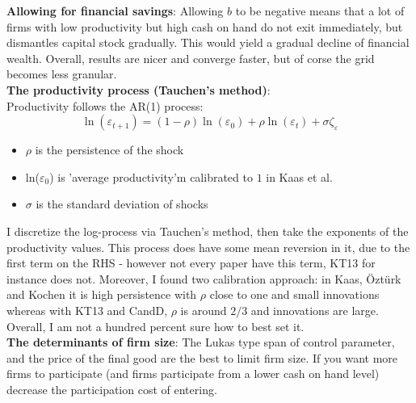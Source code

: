 \documentclass[12pt]{article}
\begin{document}
\textbf{Allowing for financial savings}:  Allowing $b$ to be negative means that a lot of firms with low productivity but high cash on hand do not exit immediately, but dismantles capital stock gradually. This would yield a gradual decline of financial wealth. Overall, results are nicer and converge faster, but of corse the grid becomes less granular. \vspace{3mm} \\
\textbf{The productivity process (Tauchen's method)}: \\
Productivity follows the AR(1) process:
$$ \ln(\varepsilon_{t+1}) = (1-\rho) \ln(\varepsilon_0) + \rho \ln(\varepsilon_t) + \sigma \zeta_\varepsilon $$
\begin{itemize}\setlength\itemsep{0em} \small
    \item $\rho$ is the persistence of the shock
    \item ln($\varepsilon_0$) is 'average productivity'm calibrated to $1$ in Kaas et al.
    \item $\sigma$ is the standard deviation of shocks
\end{itemize} \normalsize
I discretize the log-process via Tauchen's method, then take the exponents of the productivity values. This process does have some mean reversion in it, due to the first term on the RHS - however not every paper have this term, KT13 for instance does not. Moreover, I found two calibration approach: in Kaas, Öztürk and Kochen it is high persistence with $\rho$ close to one and small innovations whereas with KT13 and CandD, $\rho$ is around $2/3$ and innovations are large. Overall, I am not a hundred percent sure how to best set it.  \vspace{3mm} \\
\textbf{The determinants of firm size}: The Lukas type span of control parameter, and the price of the final good are the best to limit firm size. If you want more firms to participate (and firms participate from a lower cash on hand level) decrease the participation cost of entering.
\end{document}
